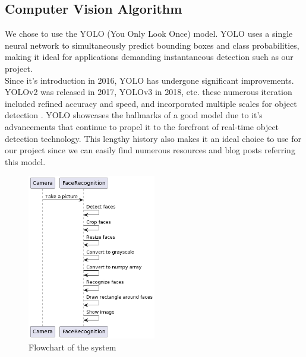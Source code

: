 \subsection{Computer Vision Algorithm}
\label{subsec:Computer Vision Algorithm - YOLOv6}
We chose to use the YOLO (You Only Look Once) \cite{YOLO} model. YOLO uses a single neural network to simultaneously predict bounding boxes and class probabilities, making it ideal for applications demanding instantaneous detection such as our project. \\
Since it's introduction in 2016, YOLO has undergone significant improvements. YOLOv2 was released in 2017, YOLOv3 in 2018, etc. these numerous iteration included refined accuracy and speed, and incorporated multiple scales for object detection \cite{YOLO4}. YOLO showcases the hallmarks of a good model due to it's advancements that continue to propel it to the forefront of real-time object detection technology. This lengthy history also makes it an ideal choice to use for our project since we can easily find numerous resources and blog posts referring this model.\cite{YOLO5}\\
\begin{figure}[h]
    \centering
    \includegraphics[width=0.5\textwidth]{images/Diagram-1.png}
    \caption{Flowchart of the system}
    \label{fig:flowchart}
\end{figure}

